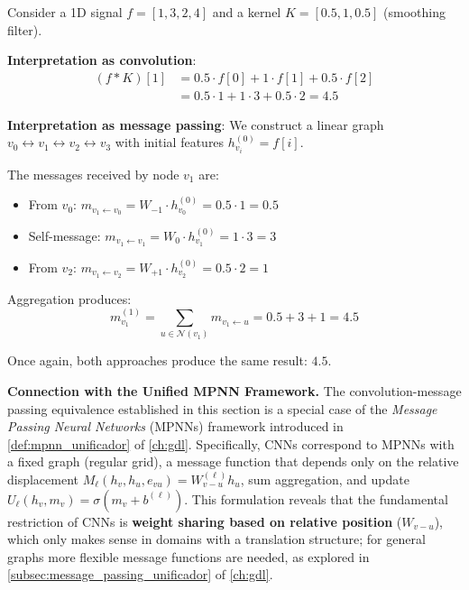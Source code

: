 \begin{example}[Step-by-Step Demonstration: Convolution = Message Passing]\label{ex:paso_a_paso_conv_mp}
Consider a 1D signal $f = [1, 3, 2, 4]$ and a kernel $K = [0.5, 1, 0.5]$ (smoothing filter).

\textbf{Interpretation as convolution}:
\begin{align}
(f * K)[1] &= 0.5 \cdot f[0] + 1 \cdot f[1] + 0.5 \cdot f[2] \\
           &= 0.5 \cdot 1 + 1 \cdot 3 + 0.5 \cdot 2 = 4.5
\end{align}

\textbf{Interpretation as message passing}:
We construct a linear graph $v_0 \leftrightarrow v_1 \leftrightarrow v_2 \leftrightarrow v_3$ with initial features $h_{v_i}^{(0)} = f[i]$.

The messages received by node $v_1$ are:
\begin{itemize}
    \item From $v_0$: $m_{v_1 \leftarrow v_0} = W_{-1} \cdot h_{v_0}^{(0)} = 0.5 \cdot 1 = 0.5$
    \item Self-message: $m_{v_1 \leftarrow v_1} = W_0 \cdot h_{v_1}^{(0)} = 1 \cdot 3 = 3$
    \item From $v_2$: $m_{v_1 \leftarrow v_2} = W_{+1} \cdot h_{v_2}^{(0)} = 0.5 \cdot 2 = 1$
\end{itemize}

Aggregation produces:
\[
m_{v_1}^{(1)} = \sum_{u \in \mathcal{N}(v_1)} m_{v_1 \leftarrow u} = 0.5 + 3 + 1 = 4.5
\]

Once again, both approaches produce the same result: $4.5$.
\end{example}

\textbf{Connection with the Unified MPNN Framework.} The convolution-message passing equivalence established in this section is a special case of the \textit{Message Passing Neural Networks} (\glspl{MPNN}) framework introduced in \autoref{def:mpnn_unificador} of \autoref{ch:gdl}. Specifically, CNNs correspond to MPNNs with a fixed graph (regular grid), a message function that depends only on the relative displacement $M_\ell(h_v, h_u, e_{vu}) = W_{v-u}^{(\ell)} h_u$, sum aggregation, and update $U_\ell(h_v, m_v) = \sigma(m_v + b^{(\ell)})$. This formulation reveals that the fundamental restriction of CNNs is \textbf{weight sharing based on relative position} ($W_{v-u}$), which only makes sense in domains with a translation structure; for general graphs more flexible message functions are needed, as explored in \autoref{subsec:message_passing_unificador} of \autoref{ch:gdl}.


